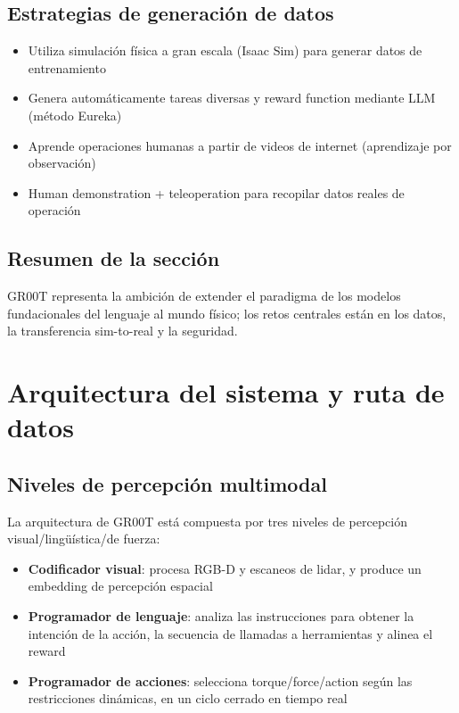 \documentclass[a4paper]{article}
\begin{document}
\subsection{Estrategias de generación de datos}

\begin{itemize}
    \item Utiliza simulación física a gran escala (Isaac Sim) para generar datos de entrenamiento
    \item Genera automáticamente tareas diversas y reward function mediante LLM (método Eureka)
    \item Aprende operaciones humanas a partir de videos de internet (aprendizaje por observación)
    \item Human demonstration + teleoperation para recopilar datos reales de operación
\end{itemize}

\subsection{Resumen de la sección}

GR00T representa la ambición de extender el paradigma de los modelos fundacionales del lenguaje al mundo físico; los retos centrales están en los datos, la transferencia sim-to-real y la seguridad.
\section{Arquitectura del sistema y ruta de datos}

\subsection{Niveles de percepción multimodal}

La arquitectura de GR00T está compuesta por tres niveles de percepción visual/lingüística/de fuerza:

\begin{itemize}
    \item \textbf{Codificador visual}: procesa RGB-D y escaneos de lidar, y produce un embedding de percepción espacial
    \item \textbf{Programador de lenguaje}: analiza las instrucciones para obtener la intención de la acción, la secuencia de llamadas a herramientas y alinea el reward
    \item \textbf{Programador de acciones}: selecciona torque/force/action según las restricciones dinámicas, en un ciclo cerrado en tiempo real
\end{itemize}
\end{document}
